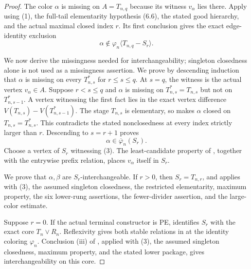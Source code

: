 \begin{proof}
The color $\alpha$ is missing on $A=T_{n,q}$ because its witness
$v_\alpha$ lies there.  Apply  using (1), the full-tail
elementarity hypothesis (6.6), the stated good hierarchy, and the actual
maximal closed index $r$.  Its first conclusion gives the exact
edge-identity exclusion
\[
 \alpha\notin
   \varphi_n\langle T_{n,q}-S_r\rangle.                         \tag{2}
\]

We now derive the missingness needed for interchangeability; singleton
closedness alone is not used as a missingness assertion.  We prove by
descending induction that $\alpha$ is missing on every $T_{n,s}^{*}$
for $r\leq s\leq q$.  At $s=q$, the witness is the actual vertex
$v_\alpha\in A$.  Suppose $r<s\leq q$ and $\alpha$ is missing on
$T_{n,s}^{*}=T_{n,s}$ but not on $T_{n,s-1}^{*}$.  A vertex witnessing
the first fact lies in the exact vertex difference
$V(T_{n,s})-V(T_{n,s-1}^{*})$.  The stage $T_{n,s}$ is elementary, so
 makes $\alpha$ closed on
$T_{n,s}=T_{n,s}^{*}$.  This contradicts the stated nonclosedness at
every index strictly larger than $r$.  Descending to $s=r+1$ proves
\[
             \alpha\in\overline\varphi_n(S_r).                 \tag{3}
\]
Choose a vertex of $S_r$ witnessing (3).  The least-candidate property
of , together with the entrywise
prefix relation, places $v_\alpha$ itself in $S_r$.

We prove that $\alpha,\beta$ are $S_r$-interchangeable.  If $r>0$,
then $S_r=T_{n,r}$, and  applies with (3), the assumed
singleton closedness, the restricted elementarity, maximum property,
the six lower-rung assertions, the fewer-divider assertion, and the
large-color estimate.

Suppose $r=0$.  If the actual terminal constructor is PE,
 identifies $S_r$ with the exact core
$T_n\vee R_n$.  Reflexivity gives both stable relations in
 at the identity coloring
$\varphi_n$.  Conclusion (iii) of , applied with
(3), the assumed singleton closedness, maximum property, and the stated
lower package, gives interchangeability on this core.


\end{proof}
